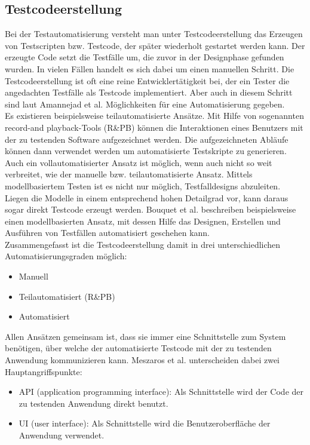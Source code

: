 \subsection{Testcodeerstellung}
\label{subsec:testcodeerstellung}
Bei der Testautomatisierung versteht man unter Testcodeerstellung das Erzeugen von Testscripten bzw. Testcode, der später wiederholt gestartet werden kann. Der erzeugte Code setzt die Testfälle um, die zuvor in der Designphase gefunden wurden.
In vielen Fällen handelt es sich dabei um einen manuellen Schritt. Die Testcodeerstellung ist oft eine reine Entwicklertätigkeit bei, der ein Tester die angedachten Testfälle als Testcode implementiert.
Aber auch in diesem Schritt sind laut Amannejad et al. \cite{amannejad_search-based_2014} Möglichkeiten für eine Automatisierung gegeben.\\
Es existieren beispielsweise teilautomatisierte Ansätze. Mit Hilfe von sogenannten \grq record-and playback\grq-Tools (R\&PB) können die Interaktionen eines Benutzers mit der zu testenden Software aufgezeichnet werden. Die aufgezeichneten Abläufe können dann verwendet werden um automatisierte Testskripte zu generieren.\\
Auch ein vollautomatisierter Ansatz ist möglich, wenn auch nicht so weit verbreitet, wie der manuelle bzw. teilautomatisierte Ansatz.
Mittels modellbasiertem Testen ist es nicht nur möglich, Testfalldesigns abzuleiten. Liegen die Modelle in einem entsprechend hohen Detailgrad vor, kann daraus sogar direkt Testcode erzeugt werden. Bouquet et al. \cite{bouquet_test_2008} beschreiben beispielsweise einen modellbasierten Ansatz, mit dessen Hilfe das Designen, Erstellen und Ausführen von Testfällen automatisiert geschehen kann.\\
Zusammengefasst ist die Testcodeerstellung damit in drei unterschiedlichen Automatisierungsgraden möglich:
\begin{itemize}
\item Manuell
\item Teilautomatisiert (R\&PB)
\item Automatisiert
\end{itemize}

Allen Ansätzen gemeinsam ist, dass sie immer eine Schnittstelle zum System benötigen, über welche der automatisierte Testcode mit der zu testenden Anwendung kommunizieren kann.
Meszaros et al. \cite{meszaros_agile_2003} unterscheiden dabei zwei Hauptangriffspunkte:
\begin{itemize}
\item API (application programming interface): Als Schnittstelle wird der Code der zu testenden Anwendung direkt benutzt.
\item UI (user interface): Als Schnittstelle wird die Benutzeroberfläche der Anwendung verwendet.
\end{itemize}

